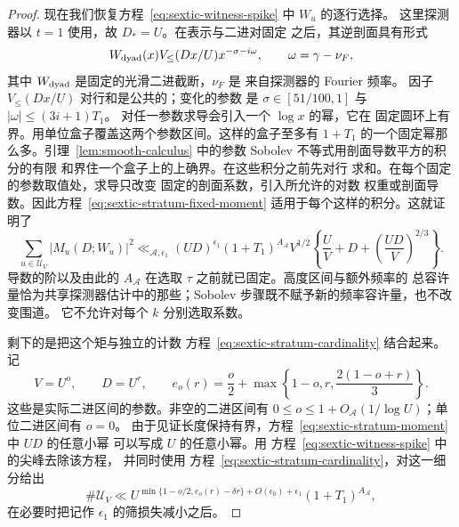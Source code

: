 \documentclass[11pt,a4paper]{article}
\numberwithin{equation}{section}
\numberwithin{figure}{section}
\theoremstyle{definition}
\theoremstyle{remark}
\begin{document}
\begin{proof}
现在我们恢复方程~\eqref{eq:sextic-witness-spike} 中 $W_u$ 的逐行选择。
这里探测器以 $t=1$ 使用，故 $D_*=U$。在表示与二进对固定
之后，其逆剖面具有形式
\[
 W_{\rm dyad}(x)V_{\le}(Dx/U)x^{-\sigma-i\omega},
 \qquad \omega=\gamma-\nu_F,
\]
其中 $W_{\rm dyad}$ 是固定的光滑二进截断，$\nu_F$ 是
来自探测器的 Fourier 频率。
因子 $V_{\le}(Dx/U)$ 对行和是公共的；变化的参数
是 $\sigma\in[51/100,1]$ 与 $|\omega|\le(3i+1)T_1$。
对任一参数求导会引入一个 $\log x$ 的幂，它在
固定圆环上有界。用单位盒子覆盖这两个参数区间。这样的盒子至多有
$1+T_1$ 的一个固定幂那么多。引理~\ref{lem:smooth-calculus} 中的参数 Sobolev
不等式用剖面导数平方的积分的有限
和界住一个盒子上的上确界。在这些积分之前先对行
求和。在每个固定的参数取值处，求导只改变
固定的剖面系数，引入所允许的对数
权重或剖面导数。因此方程~\eqref{eq:sextic-stratum-fixed-moment}
适用于每个这样的积分。这就证明了
\begin{equation}\label{eq:sextic-stratum-moment}
 \sum_{u\in\mathcal U_V}|M_u(D;W_u)|^2
 \ll_{\mathcal A,\epsilon_1}(UD)^{\epsilon_1}(1+T_1)^{A_{\mathcal A}}
 V^{1/2}\left\{\frac UV+D+
       \left(\frac{UD}{V}\right)^{2/3}\right\}.
\end{equation}
导数的阶以及由此的 $A_{\mathcal A}$ 在选取
$\tau$ 之前就已固定。高度区间与额外频率的
总容许量恰为共享探测器估计中的那些；Sobolev
步骤既不赋予新的频率容许量，也不改变围道。
它不允许对每个 $k$ 分别选取系数。

剩下的是把这个矩与独立的计数
方程~\eqref{eq:sextic-stratum-cardinality} 结合起来。记
\[
 V=U^o,\qquad D=U^r,\qquad
 e_o(r)=\frac o2+\max\left\{1-o,r,\frac{2(1-o+r)}3\right\}.
\]
这些是实际二进区间的参数。非空的二进区间有
$0\le o\le1+O_{\mathcal A}(1/\log U)$；单位二进区间有 $o=0$。
由于见证长度保持有界，方程~\eqref{eq:sextic-stratum-moment} 中 $UD$ 的任意小幂
可以写成 $U$ 的任意小幂。用
方程~\eqref{eq:sextic-witness-spike} 中的尖峰去除该方程，
并同时使用
方程~\eqref{eq:sextic-stratum-cardinality}，对这一细分给出
\begin{equation}\label{eq:sextic-stratum-envelope}
 \#\mathcal U_V
 \ll U^{\min\{1-o/2,e_o(r)-\delta r\}+O(\epsilon_0)+\epsilon_1}
       (1+T_1)^{A_{\mathcal A}},
\end{equation}
在必要时把记作 $\epsilon_1$ 的筛损失减小之后。


\end{proof}
\end{document}

